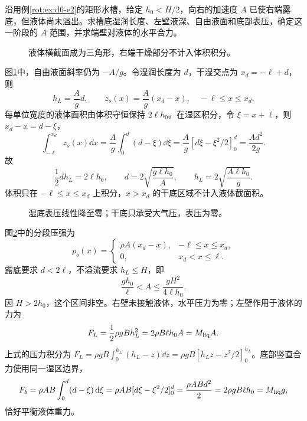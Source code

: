 \begin{exercise}[水槽右端露底后的液面]\label{rot:problem-exercise-2}\label{rot:ex:d6-h2}
沿用例\ref{rot:ex:d6-e2}的矩形水槽，给定 $h_0<H/2$，向右的加速度 $A$ 已使右端露底，但液体尚未溢出。求槽底湿润长度、左壁液深、自由液面和底部表压，确定这一阶段的 $A$ 范围，并求端壁对液体的水平合力。
\end{exercise}
\begin{figure}[H]\centering
{}
\caption{液体横截面成为三角形，右端干燥部分不计入体积积分。}\label{rot:fig:d6-h2-q}
\end{figure}
\begin{solution}
图\ref{rot:fig:d6-h2-q}中，自由液面斜率仍为 $-A/g$。令湿润长度为 $d$，干湿交点为 $x_d=-\ell+d$，则
\[
h_L=\frac Agd,\qquad z_s(x)=\frac Ag(x_d-x),\quad -\ell\le x\le x_d.
\]
每单位宽度的液体面积由体积守恒保持 $2\ell h_0$。在湿区积分，令 $\xi=x+\ell$，则 $x_d-x=d-\xi$，
\[
\int_{-\ell}^{x_d}z_s(x)\dd x
=\frac Ag\int_0^d(d-\xi)\dd\xi
=\frac Ag[d\xi-\xi^2/2]_0^d=\frac{Ad^2}{2g}.
\]
故
\[
\frac12d h_L=2\ell h_0,
\qquad d=2\sqrt{\frac{g\ell h_0}{A}},\qquad
h_L=2\sqrt{\frac{A\ell h_0}{g}}.
\]
体积只在 $-\ell\le x\le x_d$ 上积分，$x>x_d$ 的干底区域不计入液体截面积。
\begin{figure}[H]\centering
{}
\caption{湿底表压线性降至零；干底只承受大气压，表压为零。}\label{rot:fig:d6-h2-s}
\end{figure}
图\ref{rot:fig:d6-h2-s}中的分段压强为
\[
p_b(x)=\begin{cases}\rho A(x_d-x),&-\ell\le x\le x_d,\\0,&x_d<x\le\ell.\end{cases}
\]
露底要求 $d<2\ell$，不溢流要求 $h_L\le H$，即
\[
\frac{gh_0}{\ell}<A\le\frac{gH^2}{4\ell h_0}.
\]
因 $H>2h_0$，这个区间非空。右壁未接触液体，水平压力为零；左壁作用于液体的力为
\[
F_L=\frac12\rho gBh_L^2
=2\rho B\ell h_0A=M_{\rm liq}A.
\]
上式的压力积分为 $F_L=\rho gB\int_0^{h_L}(h_L-z)\dd z=\rho gB[h_Lz-z^2/2]_0^{h_L}$。底部竖直合力使用同一湿区边界，
\[
F_b=\rho AB\int_0^d(d-\xi)\mathop{}\!\mathrm d\xi
=\rho AB[d\xi-\xi^2/2]_0^d
=\frac{\rho ABd^2}2=2\rho gB\ell h_0=M_{\rm liq}g,
\]
恰好平衡液体重力。
\end{solution}



